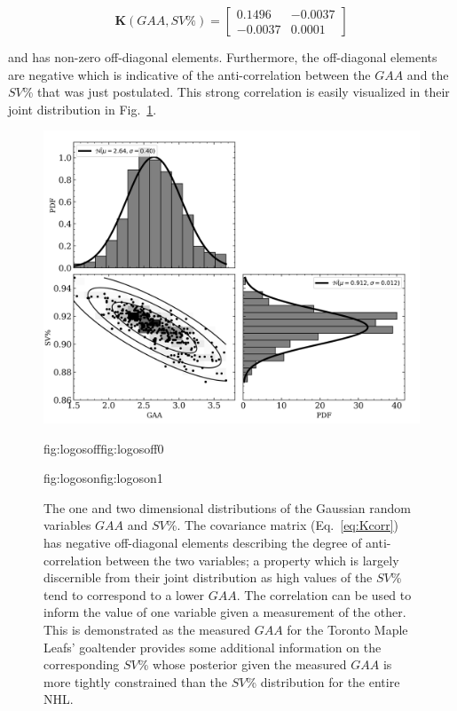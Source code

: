 \begin{equation}
  \mathbf{K}(GAA,SV\%) =
  \begin{bmatrix}
    0.1496 & -0.0037 \\
    -0.0037 & 0.0001
  \end{bmatrix}
  \label{eq:Kcorr}
\end{equation}

\noindent and has non-zero off-diagonal elements. Furthermore, the off-diagonal
elements are negative which is indicative of the anti-correlation between the
$GAA$ and the $SV$\% that was just postulated. This strong correlation
is easily visualized in their joint distribution in Fig.~\ref{fig:corr2d}. \\


\begin{figure}
  \centering
  \includegraphics[width=0.9\hsize]{figures/corr_2D_HARTpost_logo_bkgd.png}%
  \hspace{-0.9\hsize}%
  \begin{ocg}{fig:logosoff}{fig:logosoff}{0}%
  \end{ocg}%
  \begin{ocg}{fig:logoson}{fig:logoson}{1}%
  \end{ocg}
  \caption[Correlated Gaussian random variables in two dimensions.]
      {The one and two dimensional distributions of the Gaussian random
    variables $GAA$ and $SV$\%.
    The covariance matrix (Eq.~\ref{eq:Kcorr}) has negative off-diagonal
    elements describing the degree of anti-correlation between the two
    variables; a property which is largely discernible from their joint
    distribution as high values of the $SV$\% tend to correspond to a lower
    $GAA$. The correlation can be used to inform the value of one variable given a
    measurement of the other. This is demonstrated as the measured $GAA$ 
    for the Toronto Maple Leafs' goaltender 
    provides some
    additional information on the corresponding $SV$\% whose posterior given the
    measured $GAA$ is more tightly constrained than the $SV$\% distribution for
    the entire NHL.}
  \label{fig:corr2d}
\end{figure}

